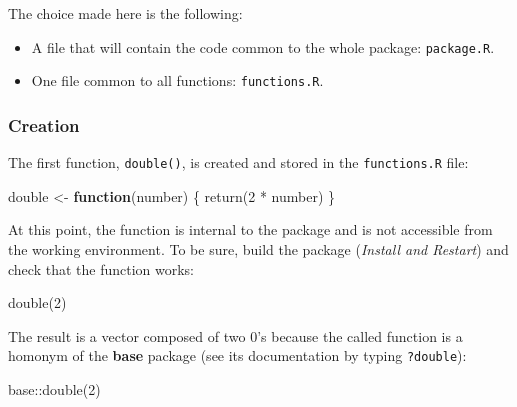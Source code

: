 \documentclass[
  12pt,
  american,
  a4paper,
  extrafontsizes,onecolumn,openright
  ]{memoir}
\newenvironment{Shaded}{\begin{snugshade}}{\end{snugshade}}
\newcommand{\ControlFlowTok}[1]{\textcolor[rgb]{0.13,0.29,0.53}{\textbf{#1}}}
\newcommand{\DecValTok}[1]{\textcolor[rgb]{0.00,0.00,0.81}{#1}}
\newcommand{\FunctionTok}[1]{\textcolor[rgb]{0.00,0.00,0.00}{#1}}
\newcommand{\NormalTok}[1]{#1}
\newcommand{\OtherTok}[1]{\textcolor[rgb]{0.56,0.35,0.01}{#1}}
\newcommand{\SpecialCharTok}[1]{\textcolor[rgb]{0.00,0.00,0.00}{#1}}
\providecommand{\tightlist}{%
  \setlength{\itemsep}{0pt}\setlength{\parskip}{0pt}}
\begin{document}
The choice made here is the following:

\begin{itemize}
\tightlist
\item
  A file that will contain the code common to the whole package: \texttt{package.R}.
\item
  One file common to all functions: \texttt{functions.R}.
\end{itemize}

\hypertarget{creation-1}{%
\subsubsection{Creation}\label{creation-1}}

The first function, \texttt{double()}, is created and stored in the \texttt{functions.R} file:

\scriptsize

\begin{Shaded}
\begin{Highlighting}[]
\NormalTok{double }\OtherTok{\textless{}{-}} \ControlFlowTok{function}\NormalTok{(number) \{}
    \FunctionTok{return}\NormalTok{(}\DecValTok{2} \SpecialCharTok{*}\NormalTok{ number)}
\NormalTok{\}}
\end{Highlighting}
\end{Shaded}

\normalsize

At this point, the function is internal to the package and is not accessible from the working environment.
To be sure, build the package (\emph{Install and Restart}) and check that the function works:

\scriptsize

\begin{Shaded}
\begin{Highlighting}[]
\FunctionTok{double}\NormalTok{(}\DecValTok{2}\NormalTok{)}
\end{Highlighting}
\end{Shaded}

\normalsize

The result is a vector composed of two 0's because the called function is a homonym of the \textbf{base} package (see its documentation by typing \texttt{?double}):

\scriptsize

\begin{Shaded}
\begin{Highlighting}[]
\NormalTok{base}\SpecialCharTok{::}\FunctionTok{double}\NormalTok{(}\DecValTok{2}\NormalTok{)}
\end{Highlighting}
\end{Shaded}
\end{document}
